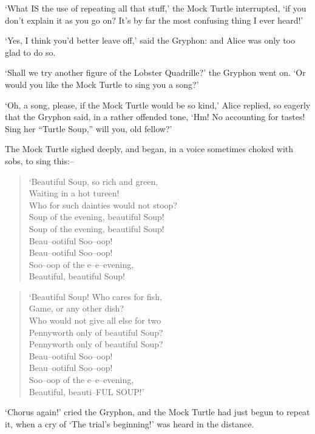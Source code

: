 \documentclass[12pt]{book}
\begin{document}
  `What IS the use of repeating all that stuff,' the Mock Turtle
interrupted, `if you don't explain it as you go on?  It's by far
the most confusing thing I ever heard!'

  `Yes, I think you'd better leave off,' said the Gryphon:  and
Alice was only too glad to do so.

  `Shall we try another figure of the Lobster Quadrille?' the
Gryphon went on.  `Or would you like the Mock Turtle to sing you
a song?'

  `Oh, a song, please, if the Mock Turtle would be so kind,'
Alice replied, so eagerly that the Gryphon said, in a rather
offended tone, `Hm!  No accounting for tastes!  Sing her
``Turtle Soup,'' will you, old fellow?'

  The Mock Turtle sighed deeply, and began, in a voice sometimes
choked with sobs, to sing this:--

\begin{verse}
    `Beautiful Soup, so rich and green,\\
    Waiting in a hot tureen!\\
    Who for such dainties would not stoop?\\
    Soup of the evening, beautiful Soup!\\
    Soup of the evening, beautiful Soup!\\
        Beau--ootiful Soo--oop!\\
        Beau--ootiful Soo--oop!\\
    Soo--oop of the e--e--evening,\\
        Beautiful, beautiful Soup!
\end{verse}
\begin{verse}
    `Beautiful Soup!  Who cares for fish,\\
    Game, or any other dish?\\
    Who would not give all else for two\\
    Pennyworth only of beautiful Soup?\\
    Pennyworth only of beautiful Soup?\\
        Beau--ootiful Soo--oop!\\
        Beau--ootiful Soo--oop!\\
    Soo--oop of the e--e--evening,\\
        Beautiful, beauti--FUL SOUP!'
\end{verse}

  `Chorus again!' cried the Gryphon, and the Mock Turtle had
just begun to repeat it, when a cry of `The trial's beginning!'
was heard in the distance.
\end{document}
